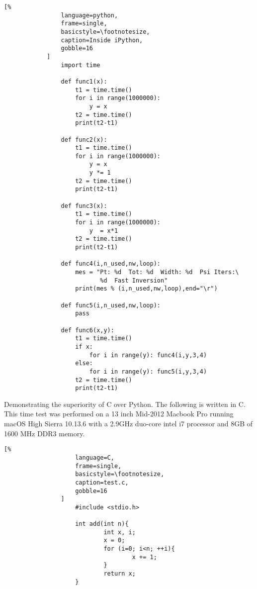 \documentclass[crop=false,class=book]{standalone}
\begin{document}
            \begin{lstlisting}[%
                language=python,
                frame=single,
                basicstyle=\footnotesize,
                caption=Inside iPython,
                gobble=16
            ]
                import time
                
                def func1(x):
                	t1 = time.time()
                	for i in range(1000000):
                		y = x
                	t2 = time.time()
                	print(t2-t1)
                
                def func2(x):
                	t1 = time.time()
                	for i in range(1000000):
                		y = x
                		y *= 1
                	t2 = time.time()
                	print(t2-t1)
                
                def func3(x):
                    t1 = time.time()
                    for i in range(1000000):
                        y  = x*1
                    t2 = time.time()
                    print(t2-t1)
                
                def func4(i,n_used,nw,loop):
                    mes = "Pt: %d  Tot: %d  Width: %d  Psi Iters:\
                           %d  Fast Inversion"
                    print(mes % (i,n_used,nw,loop),end="\r")
                
                def func5(i,n_used,nw,loop):
                	pass
                
                def func6(x,y):
                	t1 = time.time()
                	if x:
                		for i in range(y): func4(i,y,3,4)
                	else:
                		for i in range(y): func5(i,y,3,4)
                	t2 = time.time()
                	print(t2-t1)
            \end{lstlisting}
            Demonstrating the superiority of C over Python.
            The following is written in C. This time test was
            performed on a 13 inch Mid-2012 Macbook Pro running macOS
            High Sierra 10.13.6 with a 2.9GHz duo-core intel i7
            processor and 8GB of 1600 MHz DDR3 memory.
            \newpage
            \begin{minipage}[t]{.48\textwidth}
                \centering
                \begin{lstlisting}[%
                    language=C,
                    frame=single,
                    basicstyle=\footnotesize,
                    caption=test.c,
                    gobble=16
                ]
                    #include <stdio.h>
                    
                    int add(int n){
                            int x, i;
                            x = 0;
                            for (i=0; i<n; ++i){
                                    x += 1;
                            }
                            return x;
                    }
                \end{lstlisting}
            \end{minipage}\hfill
\end{document}
